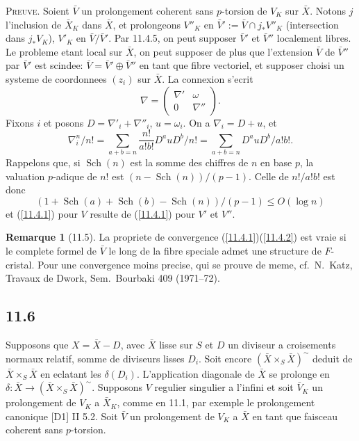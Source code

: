 \documentclass[12pt,a4paper]{article}
\theoremstyle{plain}
\theoremstyle{definition}
\newtheorem{remark}[theorem]{Remarque}
\theoremstyle{remark}
\DeclareMathOperator{\Sch}{Sch}
\begin{document}
\textsc{Preuve.} Soient $\bar{V}$ un prolongement coherent sans $p$-torsion de $V_K$ sur $\bar{X}$. Notons $j$ l'inclusion de $\bar{X}_K$ dans $\bar{X}$, et prolongeons $V''_K$ en $\bar{V}' := \bar{V} \cap j_* V''_K$ (intersection dans $j_* V_K$), $V'_K$ en $\bar{V}/\bar{V}'$. Par 11.4.5, on peut supposer $\bar{V}'$ et $\bar{V}''$ localement libres. Le probleme etant local sur $\bar{X}$, on peut supposer de plus que l'extension $\bar{V}$ de $\bar{V}''$ par $\bar{V}'$ est scindee: $\bar{V} = \bar{V}' \oplus \bar{V}''$ en tant que fibre vectoriel, et supposer choisi un systeme de coordonnees $(z_i)$ sur $\bar{X}$. La connexion s'ecrit
$$\nabla = \begin{pmatrix} \nabla' & \omega \\ 0 & \nabla'' \end{pmatrix}.$$
Fixons $i$ et posons $D = \nabla'_i + \nabla''_i$, $u = \omega_i$. On a $\nabla_i = D + u$, et
$$\nabla_i^n/n! = \sum_{a+b=n} \frac{n!}{a! b!} D^a u D^b / n! = \sum_{a+b=n} D^a u D^b / a! b!.$$
Rappelons que, si $\Sch(n)$ est la somme des chiffres de $n$ en base $p$, la valuation $p$-adique de $n!$ est $(n - \Sch(n))/(p-1)$. Celle de $n!/a! b!$ est donc
$$(1 + \Sch(a) + \Sch(b) - \Sch(n))/(p-1) \leq O(\log n)$$
et (\ref{11.4.1}) pour $V$ resulte de (\ref{11.4.1}) pour $V'$ et $V''$.


\begin{remark}[11.5]
La propriete de convergence (\ref{11.4.1})(\ref{11.4.2}) est vraie si le complete formel de $\bar{V}$ le long de la fibre speciale admet une structure de $F$-cristal. Pour une convergence moins precise, qui se prouve de meme, cf.~N.~Katz, Travaux de Dwork, Sem.~Bourbaki 409 (1971--72).
\end{remark}

\subsection*{11.6}

Supposons que $X = \bar{X} - D$, avec $\bar{X}$ lisse sur $S$ et $D$ un diviseur a croisements normaux relatif, somme de diviseurs lisses $D_i$. Soit encore $(\bar{X} \times_S \bar{X})^\sim$ deduit de $\bar{X} \times_S \bar{X}$ en eclatant les $\delta(D_i)$. L'application diagonale de $\bar{X}$ se prolonge en $\delta: \bar{X} \to (\bar{X} \times_S \bar{X})^\sim$. Supposons $V$ regulier singulier a l'infini et soit $\bar{V}_K$ un prolongement de $V_K$ a $\bar{X}_K$, comme en 11.1, par exemple le prolongement canonique [D1] II 5.2. Soit $\bar{V}$ un prolongement de $V_K$ a $\bar{X}$ en tant que faisceau coherent sans $p$-torsion.
\end{document}
